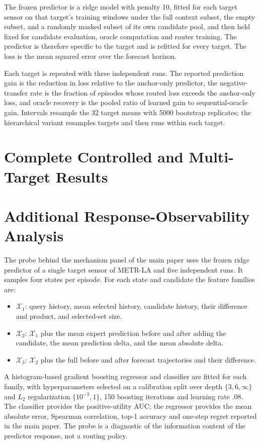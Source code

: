 \documentclass[preprint,12pt]{elsarticle}
\begin{document}
The frozen predictor is a ridge model with penalty 10, fitted for each target
sensor on that target's training windows under the full context subset, the
empty subset, and a randomly masked subset of its own candidate pool, and then
held fixed for candidate evaluation, oracle computation and router training.
The predictor is therefore specific to the target and is refitted for every
target. The loss is the mean squared error over the forecast horizon.

Each target is repeated with three independent runs. The reported prediction
gain is the reduction in loss relative to the anchor-only predictor, the
negative-transfer rate is the fraction of episodes whose routed loss exceeds
the anchor-only loss, and oracle recovery is the pooled ratio of learned gain
to sequential-oracle gain. Intervals resample the 32 target means with 5000
bootstrap replicates; the hierarchical variant resamples targets and then runs
within each target.

\section{Complete Controlled and Multi-Target Results}



\section{Additional Response-Observability Analysis}

The probe behind the mechanism panel of the main paper uses the frozen ridge
predictor of a single target sensor of METR-LA and five independent runs. It
samples four states per episode. For each state and candidate the feature
families are:
\begin{itemize}
\item $\mathcal{X}_1$: query history, mean selected history, candidate history,
their difference and product, and selected-set size.
\item $\mathcal{X}_2$: $\mathcal{X}_1$ plus the mean expert prediction before
and after adding the candidate, the mean prediction delta, and the mean
absolute delta.
\item $\mathcal{X}_3$: $\mathcal{X}_2$ plus the full before and after forecast
trajectories and their difference.
\end{itemize}
A histogram-based gradient boosting regressor and classifier are fitted for
each family, with hyperparameters selected on a calibration split over depth
$\{3,6,\infty\}$ and $L_2$ regularization $\{10^{-3},1\}$, 150 boosting
iterations and learning rate .08. The classifier provides the positive-utility
AUC; the regressor provides the mean absolute error, Spearman correlation,
top-1 accuracy and one-step regret reported in the main paper. The probe is a
diagnostic of the information content of the predictor response, not a routing
policy.
\end{document}
